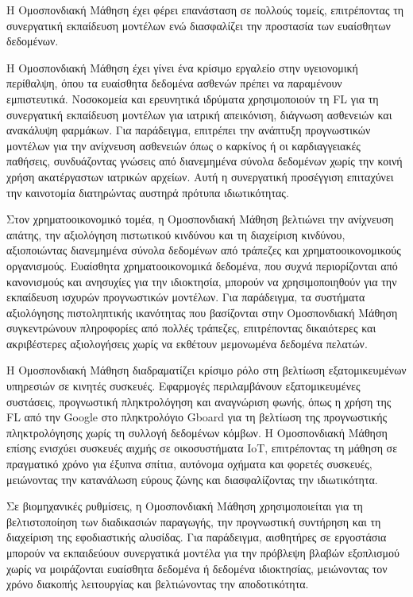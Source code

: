 Η Ομοσπονδιακή Μάθηση έχει φέρει επανάσταση σε πολλούς τομείς, επιτρέποντας τη συνεργατική εκπαίδευση μοντέλων ενώ διασφαλίζει την προστασία των ευαίσθητων δεδομένων.

Η Ομοσπονδιακή Μάθηση έχει γίνει ένα κρίσιμο εργαλείο στην υγειονομική περίθαλψη, όπου τα ευαίσθητα δεδομένα ασθενών πρέπει να παραμένουν εμπιστευτικά. Νοσοκομεία και ερευνητικά ιδρύματα χρησιμοποιούν τη FL για τη συνεργατική εκπαίδευση μοντέλων για ιατρική απεικόνιση, διάγνωση ασθενειών και ανακάλυψη φαρμάκων. Για παράδειγμα, επιτρέπει την ανάπτυξη προγνωστικών μοντέλων για την ανίχνευση ασθενειών όπως ο καρκίνος ή οι καρδιαγγειακές παθήσεις, συνδυάζοντας γνώσεις από διανεμημένα σύνολα δεδομένων χωρίς την κοινή χρήση ακατέργαστων ιατρικών αρχείων. Αυτή η συνεργατική προσέγγιση επιταχύνει την καινοτομία διατηρώντας αυστηρά πρότυπα ιδιωτικότητας.

Στον χρηματοοικονομικό τομέα, η Ομοσπονδιακή Μάθηση βελτιώνει την ανίχνευση απάτης, την αξιολόγηση πιστωτικού κινδύνου και τη διαχείριση κινδύνου, αξιοποιώντας διανεμημένα σύνολα δεδομένων από τράπεζες και χρηματοοικονομικούς οργανισμούς. Ευαίσθητα χρηματοοικονομικά δεδομένα, που συχνά περιορίζονται από κανονισμούς και ανησυχίες για την ιδιοκτησία, μπορούν να χρησιμοποιηθούν για την εκπαίδευση ισχυρών προγνωστικών μοντέλων. Για παράδειγμα, τα συστήματα αξιολόγησης πιστοληπτικής ικανότητας που βασίζονται στην Ομοσπονδιακή Μάθηση συγκεντρώνουν πληροφορίες από πολλές τράπεζες, επιτρέποντας δικαιότερες και ακριβέστερες αξιολογήσεις χωρίς να εκθέτουν μεμονωμένα δεδομένα πελατών.

Η Ομοσπονδιακή Μάθηση διαδραματίζει κρίσιμο ρόλο στη βελτίωση εξατομικευμένων υπηρεσιών σε κινητές συσκευές. Εφαρμογές περιλαμβάνουν εξατομικευμένες συστάσεις, προγνωστική πληκτρολόγηση και αναγνώριση φωνής, όπως η χρήση της FL από την Google στο πληκτρολόγιο Gboard για τη βελτίωση της προγνωστικής πληκτρολόγησης χωρίς τη συλλογή δεδομένων κόμβων. Η Ομοσπονδιακή Μάθηση επίσης ενισχύει συσκευές αιχμής σε οικοσυστήματα IoT, επιτρέποντας τη μάθηση σε πραγματικό χρόνο για έξυπνα σπίτια, αυτόνομα οχήματα και φορετές συσκευές, μειώνοντας την κατανάλωση εύρους ζώνης και διασφαλίζοντας την ιδιωτικότητα.

Σε βιομηχανικές ρυθμίσεις, η Ομοσπονδιακή Μάθηση χρησιμοποιείται για τη βελτιστοποίηση των διαδικασιών παραγωγής, την προγνωστική συντήρηση και τη διαχείριση της εφοδιαστικής αλυσίδας. Για παράδειγμα, αισθητήρες σε εργοστάσια μπορούν να εκπαιδεύουν συνεργατικά μοντέλα για την πρόβλεψη βλαβών εξοπλισμού χωρίς να μοιράζονται ευαίσθητα δεδομένα ή δεδομένα ιδιοκτησίας, μειώνοντας τον χρόνο διακοπής λειτουργίας και βελτιώνοντας την αποδοτικότητα.

